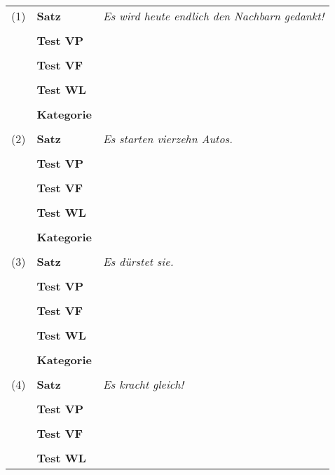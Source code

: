 \documentclass[12pt,a4paper,twoside]{article}
\begin{document}
\begin{center}
  \begin{longtable}[h]{clp{}}
    (1) & \textbf{Satz} & \textit{Es wird heute endlich den Nachbarn gedankt!} \\
    &&\\
    & \textbf{Test VP} & \\\cline{3-3}
    &&\\
    & \textbf{Test VF} & \\\cline{3-3}
    &&\\
    & \textbf{Test WL} & \\\cline{3-3}
    &&\\
    & \textbf{Kategorie} & \\\cline{3-3}
    &&\\
    (2) & \textbf{Satz} & \textit{Es starten vierzehn Autos.} \\
    &&\\
    & \textbf{Test VP} & \\\cline{3-3}
    &&\\
    & \textbf{Test VF} & \\\cline{3-3}
    &&\\
    & \textbf{Test WL} & \\\cline{3-3}
    &&\\
    & \textbf{Kategorie} & \\\cline{3-3}
    &&\\
    (3) & \textbf{Satz} & \textit{Es dürstet sie.} \\
    &&\\
    & \textbf{Test VP} & \\\cline{3-3}
    &&\\
    & \textbf{Test VF} & \\\cline{3-3}
    &&\\
    & \textbf{Test WL} & \\\cline{3-3}
    &&\\
    & \textbf{Kategorie} & \\\cline{3-3}
    &&\\
 \newpage
    (4) & \textbf{Satz} & \textit{Es kracht gleich!} \\
    &&\\
    & \textbf{Test VP} & \\\cline{3-3}
    &&\\
    & \textbf{Test VF} & \\\cline{3-3}
    &&\\
    & \textbf{Test WL} & \\\cline{3-3}

\end{longtable}
\end{center}
\end{document}
